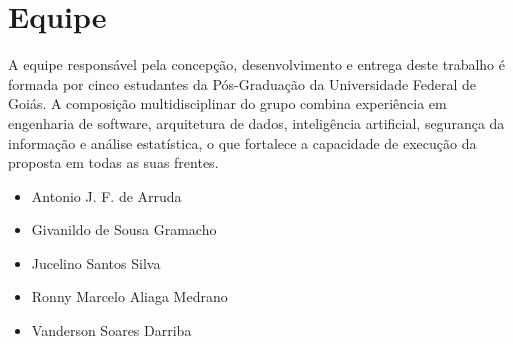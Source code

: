 \documentclass[monografia,abnt]{inf-ufg-modificado}
\begin{document}




\departamento{}

\concentracao{}

\capa
\rosto

\tabelas[]


\chapter{Equipe}

A equipe responsável pela concepção, desenvolvimento e entrega deste trabalho é formada por cinco estudantes da Pós-Graduação da Universidade Federal de Goiás. A composição multidisciplinar do grupo combina experiência em engenharia de software, arquitetura de dados, inteligência artificial, segurança da informação e análise estatística, o que fortalece a capacidade de execução da proposta em todas as suas frentes.

\begin{itemize}
    \item Antonio J. F. de Arruda
    \item Givanildo de Sousa Gramacho
    \item Jucelino Santos Silva
    \item Ronny Marcelo Aliaga Medrano
    \item Vanderson Soares Darriba
\end{itemize}
\end{document}
